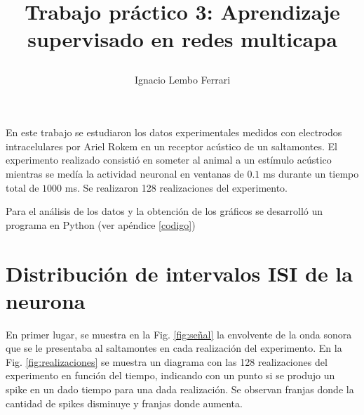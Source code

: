 \documentclass[11pt,twocolumn,twoside]{opticajnl}
\title{

\vspace{0.5cm} 

Trabajo práctico 3: Aprendizaje supervisado en redes multicapa}
\author[1]{\huge{Ignacio Lembo Ferrari}}
\affil[1]{\large{ignaciolembo@ib.edu.ar} 

\vspace{0.3cm}

\large{14 de octubre de 2023.}

\vspace{0.5cm}
}
\begin{document}
\maketitle

En este trabajo se estudiaron los datos experimentales medidos con electrodos intracelulares por Ariel Rokem en un receptor acústico de un saltamontes. El experimento realizado consistió en someter al animal a un estímulo acústico mientras se medía la actividad neuronal en ventanas de $0.1$ ms durante un tiempo total de $1000$ ms. Se realizaron 128 realizaciones del experimento.

Para el análisis de los datos y la obtención de los gráficos se desarrolló un programa en Python (ver apéndice \ref{codigo})

\section{Distribución de intervalos ISI de la neurona \label{sec:ISI}}

\vspace{0.3cm}

En primer lugar, se muestra en la Fig. \ref{fig:señal} la envolvente de la onda sonora que se le presentaba al saltamontes en cada realización del experimento. En la Fig. \ref{fig:realizaciones} se muestra un diagrama con las 128 realizaciones del experimento en función del tiempo, indicando con un punto si se produjo un spike en un dado tiempo para una dada realización. Se observan franjas donde la cantidad de spikes disminuye y franjas donde aumenta.
\end{document}
